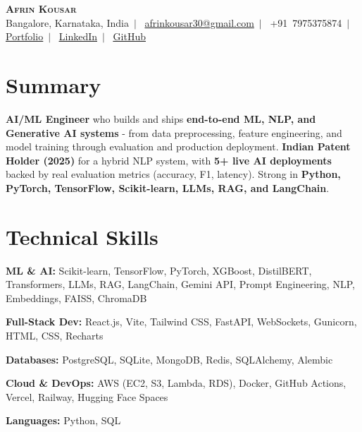 \documentclass[letterpaper,9pt]{article}
\begin{document}
\begin{center}
  {\LARGE\scshape\textbf{Afrin Kousar}}\\\vspace{3pt}
  \footnotesize
  Bangalore, Karnataka, India~$|$~
  \href{mailto:afrinkousar30@gmail.com}{afrinkousar30@gmail.com}~$|$~
  +91~7975375874~$|$~
  \href{https://afrin-kousar.netlify.app/}{\underline{Portfolio}}~$|$~
  \href{https://linkedin.com/in/afrin-kousar}{\underline{LinkedIn}}~$|$~
  \href{https://github.com/afrin2315}{\underline{GitHub}}
\end{center}
\vspace{-7pt}

\section{Summary}
{\scriptsize
\textbf{AI/ML Engineer} who builds and ships \textbf{end-to-end ML, NLP, and Generative AI systems} - from data preprocessing, feature engineering, and model training through evaluation and production deployment. \textbf{Indian Patent Holder (2025)} for a hybrid NLP system, with \textbf{5+ live AI deployments} backed by real evaluation metrics (accuracy, F1, latency). Strong in \textbf{Python, PyTorch, TensorFlow, Scikit-learn, LLMs, RAG, and LangChain}.
}

\section{Technical Skills}
\begin{itemize}[leftmargin=0.1in,label={},itemsep=1pt,topsep=2pt,parsep=0pt]
  \scriptsize{
    \item \textbf{ML \& AI:} Scikit-learn, TensorFlow, PyTorch, XGBoost, DistilBERT, Transformers, LLMs, RAG, LangChain, Gemini API, Prompt Engineering, NLP, Embeddings, FAISS, ChromaDB
    \item \textbf{Full-Stack Dev:} React.js, Vite, Tailwind CSS, FastAPI, WebSockets, Gunicorn, HTML, CSS, Recharts
    \item \textbf{Databases:} PostgreSQL, SQLite, MongoDB, Redis, SQLAlchemy, Alembic
    \item \textbf{Cloud \& DevOps:} AWS (EC2, S3, Lambda, RDS), Docker, GitHub Actions, Vercel, Railway, Hugging Face Spaces
    \item \textbf{Languages:} Python, SQL
  }
\end{itemize}
\end{document}
